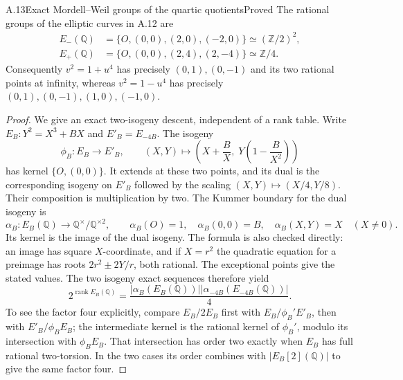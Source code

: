 \begin{statement}{A.13}{Exact Mordell--Weil groups of the quartic quotients}{Proved}
The rational groups of the elliptic curves in A.12 are
\[
 \begin{aligned}
 E_-(\mathbb Q)&=\{O,(0,0),(2,0),(-2,0)\}
                      \simeq(\mathbb Z/2)^2,\\
 E_+(\mathbb Q)&=\{O,(0,0),(2,4),(2,-4)\}
                      \simeq\mathbb Z/4.
 \end{aligned}
\]
Consequently $v^2=1+u^4$ has precisely $(0,1),(0,-1)$ and its two
rational points at infinity, whereas $v^2=1-u^4$ has precisely
$(0,1),(0,-1),(1,0),(-1,0)$.
\end{statement}
\begin{proof}
We give an exact two-isogeny descent, independent of a rank table.
Write $E_B:Y^2=X^3+BX$ and $E'_B=E_{-4B}$. The isogeny
\[
 \phi_B:E_B\longrightarrow E'_B,\qquad
 (X,Y)\longmapsto
 \left(X+\frac B X,\;Y\left(1-\frac B{X^2}\right)\right)
\]
has kernel $\{O,(0,0)\}$. It extends at these two points, and its dual
is the corresponding isogeny on $E'_B$ followed by the scaling
$(X,Y)\mapsto(X/4,Y/8)$. Their composition is multiplication by two.
The Kummer boundary for the dual isogeny is
\[
 \alpha_B:E_B(\mathbb Q)\longrightarrow
 \mathbb Q^\times/\mathbb Q^{\times2},\qquad
 \alpha_B(O)=1,\quad \alpha_B(0,0)=B,\quad
 \alpha_B(X,Y)=X\quad(X\ne0).
\]
Its kernel is the image of the dual isogeny. The formula is also checked
directly: an image has square $X$-coordinate, and if $X=r^2$ the
quadratic equation for a preimage has roots
$2r^2\pm2Y/r$, both rational. The exceptional points give the stated
values. The two isogeny exact sequences therefore yield
\[
 2^{\operatorname{rank}E_B(\mathbb Q)}
   =\frac{|\alpha_B(E_B(\mathbb Q))|
           |\alpha_{-4B}(E_{-4B}(\mathbb Q))|}{4}.
 \tag{A13.1}
\]
To see the factor four explicitly, compare $E_B/2E_B$ first with
$E_B/\phi_B' E'_B$, then with $E'_B/\phi_BE_B$; the intermediate
kernel is the rational kernel of $\phi_B'$, modulo its intersection
with $\phi_BE_B$. That intersection has order two exactly when
$E_B$ has full rational two-torsion. In the two cases its order
combines with $|E_B[2](\mathbb Q)|$ to give the same factor four.


\end{proof}
